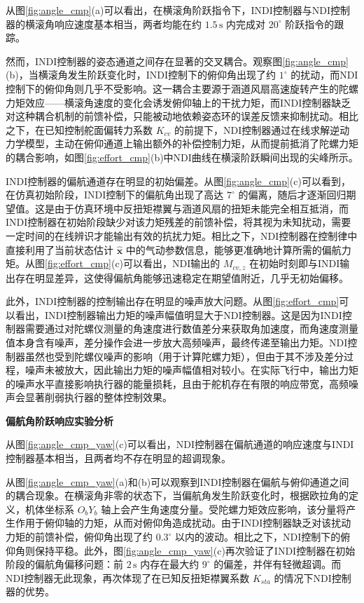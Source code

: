 从图\ref{fig:angle_cmp}(a)可以看出，在横滚角阶跃指令下，INDI控制器与NDI控制器的横滚角响应速度基本相当，两者均能在约 \(1.5\,\mathrm{s}\) 内完成对 \(20^\circ\) 阶跃指令的跟踪。

然而，INDI控制器的姿态通道之间存在显著的交叉耦合。观察图\ref{fig:angle_cmp}(b)，当横滚角发生阶跃变化时，INDI控制下的俯仰角出现了约 \(1^\circ\) 的扰动，而NDI控制下的俯仰角则几乎不受影响。这一耦合主要源于涵道风扇高速旋转产生的陀螺力矩效应——横滚角速度的变化会诱发俯仰轴上的干扰力矩，而INDI控制器缺乏对这种耦合机制的前馈补偿，只能被动地依赖姿态环的误差反馈来抑制扰动。相比之下，在已知控制舵面偏转力系数 \(K_{cv}\) 的前提下，NDI控制器通过在线求解逆动力学模型，主动在俯仰通道上输出额外的补偿控制力矩，从而提前抵消了陀螺力矩的耦合影响，如图\ref{fig:effort_cmp}(b)中NDI曲线在横滚阶跃瞬间出现的尖峰所示。

INDI控制器的偏航通道存在明显的初始偏差。从图\ref{fig:angle_cmp}(c)可以看到，在仿真初始阶段，INDI控制下的偏航角出现了高达 \(7^\circ\) 的偏离，随后才逐渐回归期望值。这是由于仿真环境中反扭矩襟翼与涵道风扇的扭矩未能完全相互抵消，而INDI控制器在初始阶段缺少对该力矩残差的前馈补偿，将其视为未知扰动，需要一定时间的在线辨识才能输出有效的抗扰力矩。相比之下，NDI控制器在控制律中直接利用了当前状态估计 \(\hat{\boldsymbol{x}}\) 中的气动参数信息，能够更准确地计算所需的偏航力矩。从图\ref{fig:effort_cmp}(c)可以看出，NDI输出的 \(M_{cv,z}\) 在初始时刻即与INDI输出存在明显差异，这使得偏航角能够迅速稳定在期望值附近，几乎无初始偏移。

此外，INDI控制器的控制输出存在明显的噪声放大问题。从图\ref{fig:effort_cmp}可以看出，INDI控制器输出力矩的噪声幅值明显大于NDI控制器。这是因为INDI控制器需要通过对陀螺仪测量的角速度进行数值差分来获取角加速度，而角速度测量值本身含有噪声，差分操作会进一步放大高频噪声，最终传递至输出力矩。NDI控制器虽然也受到陀螺仪噪声的影响（用于计算陀螺力矩），但由于其不涉及差分过程，噪声未被放大，因此输出力矩的噪声幅值相对较小。在实际飞行中，输出力矩的噪声水平直接影响执行器的能量损耗，且由于舵机存在有限的响应带宽，高频噪声会显著削弱执行器的整体控制效果。

\textbf{偏航角阶跃响应实验分析}

从图\ref{fig:angle_cmp_yaw}(c)可以看出，NDI控制器在偏航通道的响应速度与INDI控制器基本相当，且两者均不存在明显的超调现象。

从图\ref{fig:angle_cmp_yaw}(a)和(b)可以观察到INDI控制器在偏航与俯仰通道之间的耦合现象。在横滚角非零的状态下，当偏航角发生阶跃变化时，根据欧拉角的定义，机体坐标系 \(O_bY_b\) 轴上会产生角速度分量。受陀螺力矩效应影响，该分量将产生作用于俯仰轴的力矩，从而对俯仰角造成扰动。由于INDI控制器缺乏对该扰动力矩的前馈补偿，俯仰角出现了约 \(0.3^\circ\) 以内的波动。相比之下，NDI控制下的俯仰角则保持平稳。此外，图\ref{fig:angle_cmp_yaw}(c)再次验证了INDI控制器在初始阶段的偏航角偏移问题：前 \(2\,\mathrm{s}\) 内存在最大约 \(9^\circ\) 的偏差，并伴有轻微超调。而NDI控制器无此现象，再次体现了在已知反扭矩襟翼系数 \(K_{sta}\) 的情况下NDI控制器的优势。

